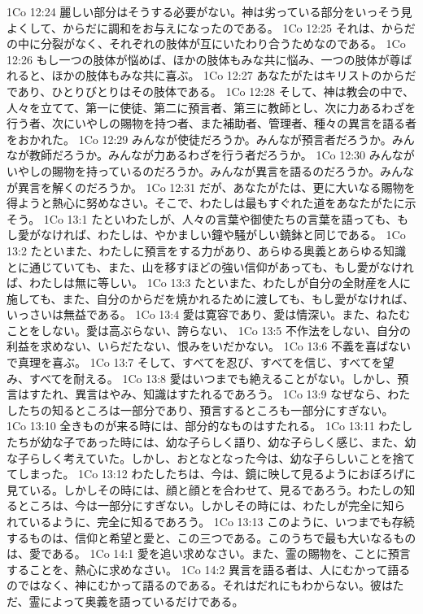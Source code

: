 1Co 12:24  麗しい部分はそうする必要がない。神は劣っている部分をいっそう見よくして、からだに調和をお与えになったのである。
1Co 12:25  それは、からだの中に分裂がなく、それぞれの肢体が互にいたわり合うためなのである。
1Co 12:26  もし一つの肢体が悩めば、ほかの肢体もみな共に悩み、一つの肢体が尊ばれると、ほかの肢体もみな共に喜ぶ。
1Co 12:27  あなたがたはキリストのからだであり、ひとりびとりはその肢体である。
1Co 12:28  そして、神は教会の中で、人々を立てて、第一に使徒、第二に預言者、第三に教師とし、次に力あるわざを行う者、次にいやしの賜物を持つ者、また補助者、管理者、種々の異言を語る者をおかれた。
1Co 12:29  みんなが使徒だろうか。みんなが預言者だろうか。みんなが教師だろうか。みんなが力あるわざを行う者だろうか。
1Co 12:30  みんながいやしの賜物を持っているのだろうか。みんなが異言を語るのだろうか。みんなが異言を解くのだろうか。
1Co 12:31  だが、あなたがたは、更に大いなる賜物を得ようと熱心に努めなさい。そこで、わたしは最もすぐれた道をあなたがたに示そう。
1Co 13:1  たといわたしが、人々の言葉や御使たちの言葉を語っても、もし愛がなければ、わたしは、やかましい鐘や騒がしい鐃鉢と同じである。
1Co 13:2  たといまた、わたしに預言をする力があり、あらゆる奥義とあらゆる知識とに通じていても、また、山を移すほどの強い信仰があっても、もし愛がなければ、わたしは無に等しい。
1Co 13:3  たといまた、わたしが自分の全財産を人に施しても、また、自分のからだを焼かれるために渡しても、もし愛がなければ、いっさいは無益である。
1Co 13:4  愛は寛容であり、愛は情深い。また、ねたむことをしない。愛は高ぶらない、誇らない、
1Co 13:5  不作法をしない、自分の利益を求めない、いらだたない、恨みをいだかない。
1Co 13:6  不義を喜ばないで真理を喜ぶ。
1Co 13:7  そして、すべてを忍び、すべてを信じ、すべてを望み、すべてを耐える。
1Co 13:8  愛はいつまでも絶えることがない。しかし、預言はすたれ、異言はやみ、知識はすたれるであろう。
1Co 13:9  なぜなら、わたしたちの知るところは一部分であり、預言するところも一部分にすぎない。
1Co 13:10  全きものが来る時には、部分的なものはすたれる。
1Co 13:11  わたしたちが幼な子であった時には、幼な子らしく語り、幼な子らしく感じ、また、幼な子らしく考えていた。しかし、おとなとなった今は、幼な子らしいことを捨ててしまった。
1Co 13:12  わたしたちは、今は、鏡に映して見るようにおぼろげに見ている。しかしその時には、顔と顔とを合わせて、見るであろう。わたしの知るところは、今は一部分にすぎない。しかしその時には、わたしが完全に知られているように、完全に知るであろう。
1Co 13:13  このように、いつまでも存続するものは、信仰と希望と愛と、この三つである。このうちで最も大いなるものは、愛である。
1Co 14:1  愛を追い求めなさい。また、霊の賜物を、ことに預言することを、熱心に求めなさい。
1Co 14:2  異言を語る者は、人にむかって語るのではなく、神にむかって語るのである。それはだれにもわからない。彼はただ、霊によって奥義を語っているだけである。
